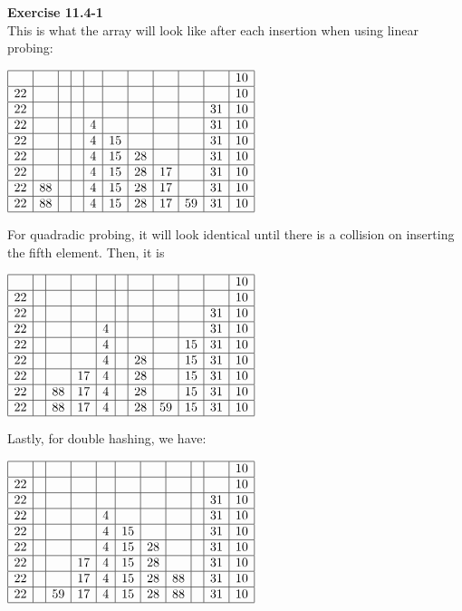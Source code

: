\documentclass{article}
\begin{document}
\noindent\textbf{ Exercise 11.4-1} \\

This is what the array will look like after each insertion when using linear probing:

$
\begin{array}{|c|c|c|c|c|c|c|c|c|c|c|}
\hline
&&&&&&&&&&10\\
\hline
22&&&&&&&&&&10\\
\hline
22&&&&&&&&&31&10\\
\hline
22&&&&4&&&&&31&10\\
\hline
22&&&&4&15&&&&31&10\\
\hline
22&&&&4&15&28&&&31&10\\
\hline
22&&&&4&15&28&17&&31&10\\
\hline
22&88&&&4&15&28&17&&31&10\\
\hline
22&88&&&4&15&28&17&59&31&10\\
\hline
\end{array}
$

For quadradic probing, it will look identical until there is a collision on inserting the fifth element. Then, it is

$
\begin{array}{|c|c|c|c|c|c|c|c|c|c|c|}
\hline
&&&&&&&&&&10\\
\hline
22&&&&&&&&&&10\\
\hline
22&&&&&&&&&31&10\\
\hline
22&&&&4&&&&&31&10\\
\hline
22&&&&4&&&&15&31&10\\
\hline
22&&&&4&&28&&15&31&10\\
\hline
22&&&17&4&&28&&15&31&10\\
\hline
22&&88&17&4&&28&&15&31&10\\
\hline
22&&88&17&4&&28&59&15&31&10\\
\hline
\end{array}
$ 

Lastly, for double hashing, we have:

$
\begin{array}{|c|c|c|c|c|c|c|c|c|c|c|}
\hline
&&&&&&&&&&10\\
\hline
22&&&&&&&&&&10\\
\hline
22&&&&&&&&&31&10\\
\hline
22&&&&4&&&&&31&10\\
\hline
22&&&&4&15&&&&31&10\\
\hline
22&&&&4&15&28&&&31&10\\
\hline
22&&&17&4&15&28&&&31&10\\
\hline
22&&&17&4&15&28&88&&31&10\\
\hline
22&&59&17&4&15&28&88&&31&10\\
\hline
\end{array}
$ 
\end{document}
